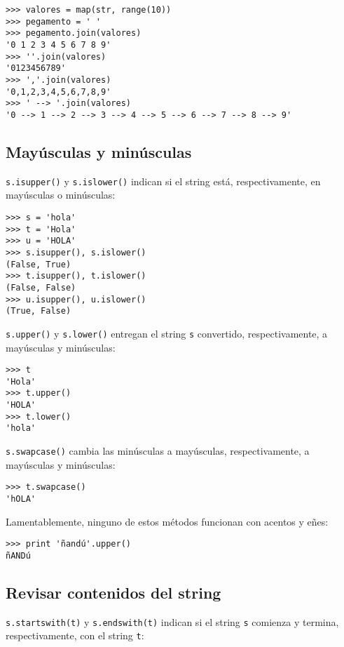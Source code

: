 \begin{lstlisting}
>>> valores = map(str, range(10))
>>> pegamento = ' '
>>> pegamento.join(valores)
'0 1 2 3 4 5 6 7 8 9'
>>> ''.join(valores)
'0123456789'
>>> ','.join(valores)
'0,1,2,3,4,5,6,7,8,9'
>>> ' --> '.join(valores)
'0 --> 1 --> 2 --> 3 --> 4 --> 5 --> 6 --> 7 --> 8 --> 9'
\end{lstlisting}

\subsection{Mayúsculas y minúsculas}

\lstinline!s.isupper()! y \lstinline!s.islower()! indican si el string
está, respectivamente, en mayúsculas o minúsculas:

\begin{lstlisting}
>>> s = 'hola'
>>> t = 'Hola'
>>> u = 'HOLA'
>>> s.isupper(), s.islower()
(False, True)
>>> t.isupper(), t.islower()
(False, False)
>>> u.isupper(), u.islower()
(True, False)
\end{lstlisting}

\lstinline!s.upper()! y \lstinline!s.lower()! entregan el string
\lstinline!s! convertido, respectivamente, a mayúsculas y minúsculas:

\begin{lstlisting}
>>> t
'Hola'
>>> t.upper()
'HOLA'
>>> t.lower()
'hola'
\end{lstlisting}

\lstinline!s.swapcase()! cambia las minúsculas a mayúsculas,
respectivamente, a mayúsculas y minúsculas:

\begin{lstlisting}
>>> t.swapcase()
'hOLA'
\end{lstlisting}

Lamentablemente, ninguno de estos métodos funcionan con acentos y eñes:

\begin{lstlisting}
>>> print 'ñandú'.upper()
ñANDú
\end{lstlisting}

\subsection{Revisar contenidos del string}

\lstinline!s.startswith(t)! y \lstinline!s.endswith(t)! indican si el
string \lstinline!s! comienza y termina, respectivamente, con el string
\lstinline!t!:

